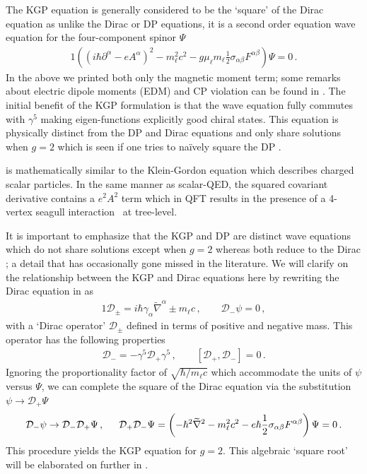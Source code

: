 The KGP equation is generally considered to be the `square' of the Dirac equation as unlike the Dirac or DP equations, it is a second order equation wave equation for the four-component spinor $\Psi$
\begin{alignat}{1}
	\label{kgp:1} \left((i\hbar\partial^{\alpha}-eA^{\alpha})^{2}-m_{\ell}^{2}c^{2}-g\mu_{\ell}m_{\ell}\frac{1}{2}\sigma_{\alpha\beta}F^{\alpha\beta}\right)\Psi=0\,.
\end{alignat}
In the above we printed both only the magnetic moment term; some remarks about electric dipole moments (EDM) and CP violation can be found in . The initial benefit of the KGP formulation is that the wave equation fully commutes with $\gamma^{5}$ making eigen-functions explicitly good chiral states. This equation is physically distinct from the DP and Dirac equations and only share solutions when $g\!=\!2$ which is seen if one tries to na{\"i}vely square the DP .

 is mathematically similar to the Klein-Gordon equation which describes charged scalar particles. In the same manner as scalar-QED, the squared covariant derivative contains a $e^{2}A^{2}$ term which in QFT results in the presence of a 4-vertex seagull interaction~\citep{Schwartz:2014sze} at tree-level.

It is important to emphasize that the KGP  and DP  are distinct wave equations which do not share solutions except when $g\!=\!2$ whereas both reduce to the Dirac ; a detail that has occasionally gone missed in the literature. We will clarify on the relationship between the KGP and Dirac equations here by rewriting the Dirac equation in  as
\begin{alignat}{1}
	\label{do:1} \mathcal{D}_{\pm}=i\hbar\gamma_{\alpha}\widetilde\nabla^{\alpha}\pm m_{\ell}c\,,\qquad
    \mathcal{D}_{-}\psi=0\,,
\end{alignat}
with a `Dirac operator' $\mathcal{D}_{\pm}$ defined in terms of positive and negative mass. This operator has the following properties
\begin{gather}
    \label{do:2}
    \mathcal{D}_{-}=-\gamma^{5}\mathcal{D}_{+}\gamma^{5}\,,\qquad
    [\mathcal{D}_{+},\mathcal{D}_{-}]=0\,.
\end{gather}
Ignoring the proportionality factor of $\sqrt{\hbar/m_{\ell}c}$ which accommodate the units of $\psi$ versus $\Psi$, we can complete the square of the Dirac equation via the substitution $\psi\rightarrow\mathcal{D}_{+}\Psi$
\begin{alignat}{1}
	\label{do:3} \mathcal{D}_{-}\psi\rightarrow\mathcal{D}_{-}\mathcal{D}_{+}\Psi\,,\indent\mathcal{D}_{+}\mathcal{D}_{-}\Psi=\left(-\hbar^{2}\widetilde\nabla^{2}-m_{\ell}^{2}c^{2}-e\hbar\frac{1}{2}\sigma_{\alpha\beta}F^{\alpha\beta}\right)\Psi=0\,.
\end{alignat}
This procedure yields the KGP equation for $g\!=\!2$. This algebraic `square root' will be elaborated on further in .

